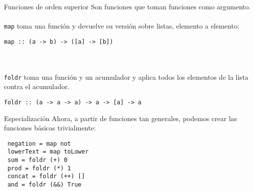 \begin{frame}[fragile]{Funciones de orden superior}
  Son funciones que toman funciones como argumento.
  \\~\\
  \texttt{map} toma una función y devuelve su versión sobre listas,
  elemento a elemento:
  \begin{lstlisting}
map :: (a -> b) -> ([a] -> [b])
  \end{lstlisting}
  \\~\\
  \texttt{foldr} toma una función y un acumulador y aplica todos los elementos
  de la lista contra el acumulador.
  \begin{lstlisting}
foldr :: (a -> a -> a) -> a -> [a] -> a
  \end{lstlisting}
\end{frame}

\begin{frame}[fragile]{Especialización}
  Ahora, a partir de funciones tan generales, podemos crear las funciones básicas
  trivialmente:
  \begin{lstlisting}
 negation = map not
 lowerText = map toLower
 sum = foldr (+) 0
 prod = foldr (*) 1
 concat = foldr (++) []
 and = foldr (&&) True
  \end{lstlisting}

\end{frame}
